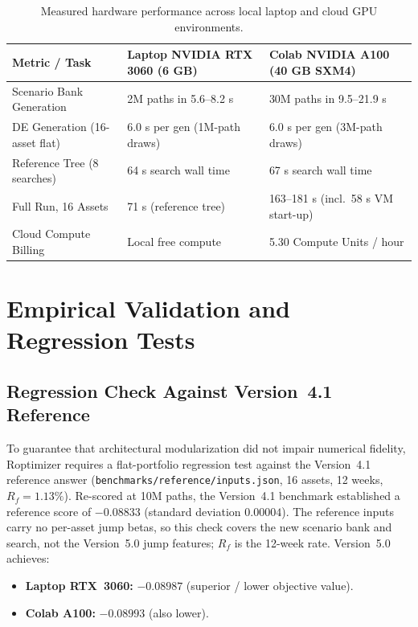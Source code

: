 \documentclass[11pt]{article}
\begin{document}
\begin{table}[H]
\centering
\caption{Measured hardware performance across local laptop and cloud GPU environments.}
\label{tab:benchmarks}
\small
\setlength{\tabcolsep}{4pt}
\begin{tabular}{p{4.2cm}p{5.1cm}p{5.5cm}}
\toprule
Metric / Task & Laptop NVIDIA RTX 3060 (6 GB) & Colab NVIDIA A100 (40 GB SXM4) \\
\midrule
Scenario Bank Generation & 2M paths in 5.6--8.2 s & 30M paths in 9.5--21.9 s \\
DE Generation (16-asset flat) & 6.0 s per gen (1M-path draws) & 6.0 s per gen (3M-path draws) \\
Reference Tree (8 searches) & 64 s search wall time & 67 s search wall time \\
Full Run, 16 Assets & 71 s (reference tree) & 163--181 s (incl.\ 58 s VM start-up) \\
Cloud Compute Billing & Local free compute & 5.30 Compute Units / hour \\
\bottomrule
\end{tabular}
\end{table}

\section{Empirical Validation and Regression Tests}\label{sec:val}
\subsection{Regression Check Against Version~4.1 Reference}
To guarantee that architectural modularization did not impair numerical fidelity, Roptimizer requires a
flat-portfolio regression test against the Version~4.1 reference answer
(\nolinkurl{benchmarks/reference/inputs.json}, 16 assets, 12 weeks, $R_f = 1.13\%$). Re-scored at 10M paths,
the Version~4.1 benchmark established a reference score of $-0.08833$ (standard deviation $0.00004$).
The reference inputs carry no per-asset jump betas, so this check covers the new scenario bank and search, not
the Version~5.0 jump features; $R_f$ is the 12-week rate.
Version~5.0 achieves:
\begin{itemize}[nosep]
\item \textbf{Laptop RTX~3060:} $-0.08987$ (superior / lower objective value).
\item \textbf{Colab A100:} $-0.08993$ (also lower).
\end{itemize}
\end{document}

